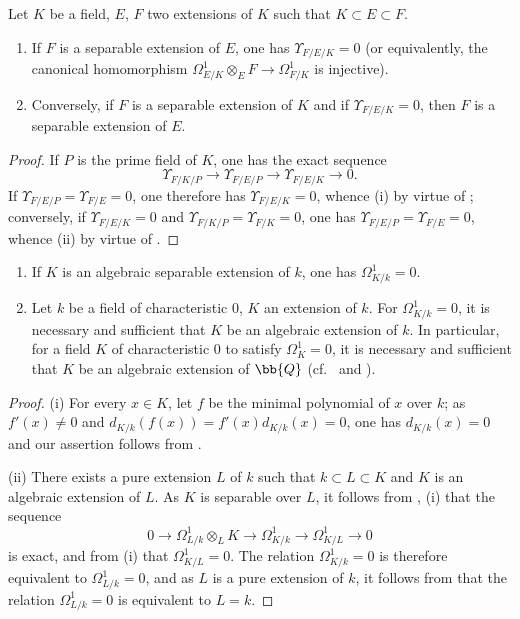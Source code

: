 \begin{corollary}[20.6.19]
\label{0.20.6.19}
Let $K$ be a field, $E$, $F$ two extensions of $K$ such that $K\subset E\subset F$.
\begin{enumerate}
  \item[\rm(i)] If $F$ is a separable extension of $E$, one has $\Upsilon_{F/E/K}=0$ \textup{(}or equivalently, the canonical homomorphism $\Omega^1_{E/K}\otimes_E F\to\Omega^1_{F/K}$ is injective\textup{)}.
  \item[\rm(ii)] Conversely, if $F$ is a separable extension of $K$ and if $\Upsilon_{F/E/K}=0$, then $F$ is a separable extension of $E$.
\end{enumerate}
\end{corollary}

\begin{proof}
If $P$ is the prime field of $K$, one has the exact sequence 
\[
  \Upsilon_{F/K/P}\to\Upsilon_{F/E/P}\to\Upsilon_{F/E/K}\to 0.
\]
If $\Upsilon_{F/E/P}=\Upsilon_{F/E}=0$, one therefore has $\Upsilon_{F/E/K}=0$, whence (i) by virtue of ; conversely, if $\Upsilon_{F/E/K}=0$ and $\Upsilon_{F/K/P}=\Upsilon_{F/K}=0$, one has $\Upsilon_{F/E/P}=\Upsilon_{F/E}=0$, whence (ii) by virtue of .
\end{proof}

\begin{corollary}[20.6.20]
\label{0.20.6.20}
\begin{enumerate}
  \item[\rm(i)] If $K$ is an algebraic separable extension of $k$, one has $\Omega^1_{K/k}=0$.
  \item[\rm(ii)] Let $k$ be a field of characteristic $0$, $K$ an extension of $k$.
  For $\Omega^1_{K/k}=0$, it is necessary and sufficient that $K$ be an algebraic extension of $k$.
  In particular, for a field $K$ of characteristic $0$ to satisfy $\Omega^1_K=0$, it is necessary and sufficient that $K$ be an algebraic extension of $\bb{Q}$ (cf.\  and ).
\end{enumerate}
\end{corollary}

\begin{proof}
(i) For every $x\in K$, let $f$ be the minimal polynomial of $x$ over $k$; as $f'(x)\neq 0$ and $d_{K/k}(f(x))=f'(x)d_{K/k}(x)=0$, one has $d_{K/k}(x)=0$ and our assertion follows from .

(ii) There exists a pure extension $L$ of $k$ such that $k\subset L\subset K$ and $K$ is an algebraic extension of $L$.
As $K$ is separable over $L$, it follows from , (i) that the sequence
\[
  0\to\Omega^1_{L/k}\otimes_L K\to\Omega^1_{K/k}\to\Omega^1_{K/L}\to 0
\]
is exact, and from (i) that $\Omega^1_{K/L}=0$.
The relation $\Omega^1_{K/k}=0$ is therefore equivalent to $\Omega^1_{L/k}=0$, and as $L$ is a pure extension of $k$, it follows from  that the relation $\Omega^1_{L/k}=0$ is equivalent to $L=k$.
\end{proof}

